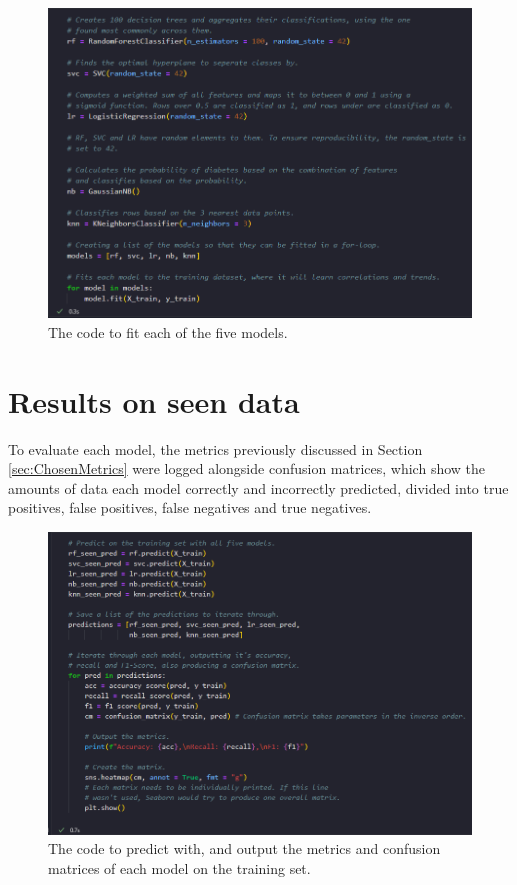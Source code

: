 \documentclass[12pt]{report}
\begin{document}
\begin{figure}[H]
    \centering 
    \includegraphics[width=\linewidth]{ModelDev/Iteration1/Code/Fitting.png}
    \caption{The code to fit each of the five models.}
    \label{fig:ModelFitting}
\end{figure}


\pagebreak
\section{Results on seen data}

To evaluate each model, the metrics previously discussed in Section \ref{sec:ChosenMetrics} 
were logged alongside confusion matrices, which show the amounts of data
each model correctly and incorrectly predicted, divided into true positives, false positives, 
false negatives and true negatives.

\begin{figure}[H]
    \centering 
    \includegraphics[width=\linewidth]{ModelDev/Iteration1/Code/Seen/Matrices.png}
    \caption{The code to predict with, and output the metrics and confusion matrices of each model on the training set.}
    \label{fig:SeenDataCode}
\end{figure}
\end{document}
